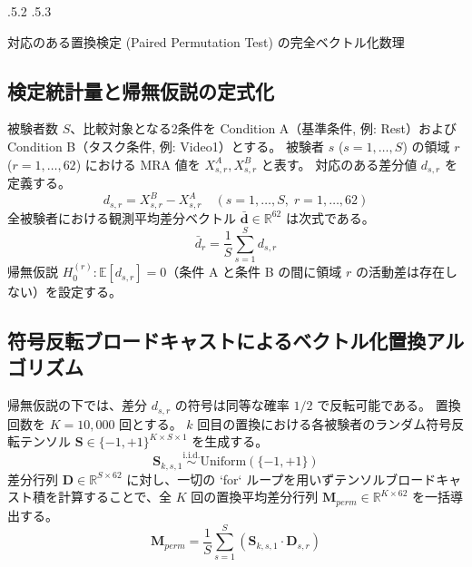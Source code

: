 \documentclass[platex,dvipdfmx,12pt]{jsarticle}
\makeatletter
\renewcommand{\section}{%
  \clearpage
  \@startsection{section}{1}{\z@}%
  {\Cvs \@plus.5\Cdp \@minus.2\Cdp}%
  {.5\Cvs \@plus.3\Cdp}%
  {\normalfont\LARGE\headfont\raggedright}%
}
\makeatother
\begin{document}
\section{対応のある置換検定 (Paired Permutation Test) の完全ベクトル化数理}

\subsection{検定統計量と帰無仮説の定式化}
被験者数 $S$、比較対象となる2条件を Condition A（基準条件, 例: Rest）および Condition B（タスク条件, 例: Video1）とする。
被験者 $s$ ($s=1, \dots, S$) の領域 $r$ ($r=1, \dots, 62$) における MRA 値を $X_{s, r}^A, X_{s, r}^B$ と表す。
対応のある差分値 $d_{s, r}$ を定義する。
\begin{equation}
  d_{s, r} = X_{s, r}^B - X_{s, r}^A \quad (s=1, \dots, S, \; r=1, \dots, 62)
  \label{eq:paired_diff}
\end{equation}
全被験者における観測平均差分ベクトル $\bar{\mathbf{d}} \in \mathbb{R}^{62}$ は次式である。
\begin{equation}
  \bar{d}_r = \frac{1}{S} \sum_{s=1}^S d_{s, r}
  \label{eq:observed_mean_diff}
\end{equation}
帰無仮説 $H_0^{(r)}: \mathbb{E}[d_{s, r}] = 0$（条件 A と条件 B の間に領域 $r$ の活動差は存在しない）を設定する。

\subsection{符号反転ブロードキャストによるベクトル化置換アルゴリズム}
帰無仮説の下では、差分 $d_{s, r}$ の符号は同等な確率 $1/2$ で反転可能である\cite{nichols2002nonparametric}。
置換回数を $K = 10,000$ 回とする。
$k$ 回目の置換における各被験者のランダム符号反転テンソル $\mathbf{S} \in \{-1, +1\}^{K \times S \times 1}$ を生成する。
\begin{equation}
  \mathbf{S}_{k, s, 1} \overset{\text{i.i.d.}}{\sim} \text{Uniform}(\{-1, +1\})
  \label{eq:sign_tensor}
\end{equation}
差分行列 $\mathbf{D} \in \mathbb{R}^{S \times 62}$ に対し、一切の `for` ループを用いずテンソルブロードキャスト積を計算することで、全 $K$ 回の置換平均差分行列 $\mathbf{M}_{perm} \in \mathbb{R}^{K \times 62}$ を一括導出する。
\begin{equation}
  \mathbf{M}_{perm} = \frac{1}{S} \sum_{s=1}^S \left( \mathbf{S}_{k, s, 1} \cdot \mathbf{D}_{s, r} \right)
  \label{eq:perm_diff_matrix}
\end{equation}
\end{document}
